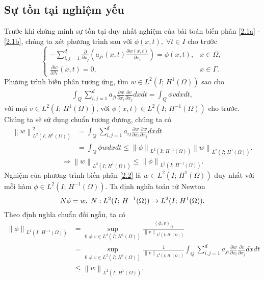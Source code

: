 \documentclass[]{article}
\begin{document}
\subsection{Sự tồn tại nghiệm yếu}
\qquad Trước khi chứng minh sự tồn tại duy nhất nghiệm của bài toán biến phân \eqref{2.1a} - \eqref{2.1b}, chúng ta xét phương trình sau với $\phi(x, t), \; \forall t \in I$ cho trước
$$\begin{cases}
	-\sum_{i, j=1}^{d}\frac{\partial }{\partial x_j}\left(a_{ji}(x, t)\frac{\partial w(x, t)}{\partial x_i}\right)=\phi(x, t), & x \in \Omega,\\
	\frac{\partial w}{\partial \mathcal{N}}(x, t)=0, &x\in \Gamma.
\end{cases}$$
Phương trình biến phân tương ứng, tìm $w\in L^2(I;\, H^1(\Omega))$ sao cho
\begin{align}\label{2.2}
	\int_{Q}\sum_{i, j=1}^{d}a_{ji}\frac{\partial w}{\partial x_i}\frac{\partial v}{\partial x_j}dxdt=\int_{Q}\phi vdxdt,
\end{align}
với mọi $v\in L^2\left(I;\, H^1(\Omega)\right)$, với $\phi(x, t)\in L^2(I;\, H^{-1}(\Omega))$ cho trước. 
\\
Chúng ta sẽ sử dụng chuẩn tương đương, chúng ta có 
\begin{align*}
	\left\|w\right\|_{L^2(I;\, H^1(\Omega))}^2&=\int_{Q}\sum_{i, j=1}^{d}a_{ij}\frac{\partial w}{\partial x_i}\frac{\partial w}{\partial x_j}dxdt\\
	&=\int_{Q}\phi wdxdt\leq \left\|\phi\right\|_{L^2(I;\, H^{-1}(\Omega))}\left\|w\right\|_{L^2(I;\, H^1(\Omega))}. 
\end{align*}
$$\Rightarrow\left\|w\right\|_{L^2(I;\, H^1(\Omega))}\leq \left\|\phi\right\|_{L^2(I;\, H^{-1}(\Omega))}.$$
Nghiệm của phương trình biến phân \eqref{2.2} là $w\in L^2(I;\, H^1(\Omega))$ duy nhất với mỗi hàm $\phi\in L^2(I;\, H^{-1}(\Omega))$. Ta định nghĩa toán tử Newton
$$\mathnormal{N}\phi=w,\;\mathnormal{N}: L^2(I;\, H^{-1}(\Omega))\to L^2(I;\, H^1(\Omega)).$$
Theo định nghĩa chuẩn đối ngẫu, ta có
\begin{align*}
	\left\|\phi\right\|_{L^2(I;\, H^{-1}(\Omega))}&=\sup_{0\neq v\in L^2(I;\, H^1(\Omega))}\frac{\left\langle\phi, v\right\rangle_{Q}}{\left\|v\right\|_{L^2(I;\, H^1(\Omega))}}\\
	&=\sup_{0\neq v\in L^2(I;\, H^1(\Omega))}\frac{1}{\left\|v\right\|_{L^2(I;\, H^1(\Omega))}}\int_{Q}\sum_{i, j=1}^{d}a_{ji}\frac{\partial w}{\partial x_i}\frac{\partial v}{\partial x_j}dxdt\\
	&\leq \left\|w\right\|_{L^2(I;\, H^1(\Omega))}.
\end{align*}
\end{document}
